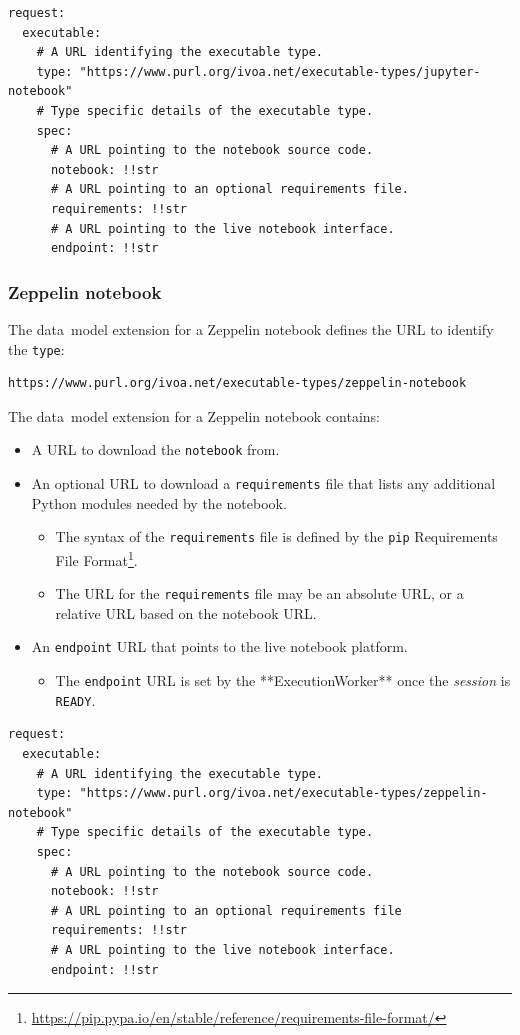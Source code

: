 \documentclass[11pt,a4paper]{ivoa}
\newcommand{\datamodel} {data~model}
\newcommand{\execworkerclass} {**ExecutionWorker**}
\newcommand{\workerjob}[1] {\textit{session#1}}
\newcommand{\python} {Python}
\newcommand{\zeppelin} {Zeppelin}
\newcommand{\codeword}[1] {\texttt{#1}}
\newcommand{\footurl}[1] {\footnote{\url{#1}}}
\begin{document}
\begin{lstlisting}[]
request:
  executable:
    # A URL identifying the executable type.
    type: "https://www.purl.org/ivoa.net/executable-types/jupyter-notebook"
    # Type specific details of the executable type.
    spec:
      # A URL pointing to the notebook source code.
      notebook: !!str
      # A URL pointing to an optional requirements file.
      requirements: !!str
      # A URL pointing to the live notebook interface.
      endpoint: !!str
\end{lstlisting}

\subsubsection{Zeppelin notebook}
\label{datamodel-zeppelin-notebook}

The \datamodel{} extension for a \zeppelin{} notebook defines the URL
to identify the \codeword{type}:
\begin{lstlisting}[]
https://www.purl.org/ivoa.net/executable-types/zeppelin-notebook
\end{lstlisting}
\hfill \break
The \datamodel{} extension for a \zeppelin{} notebook contains:
\begin{itemize}
    \item A URL to download the \codeword{notebook} from.
    \item An optional URL to download a \codeword{requirements} file that lists any additional
    \python{} modules needed by the notebook.
    \begin{itemize}
        \item The syntax of the \codeword{requirements} file is defined by the \codeword{pip}
        Requirements File Format\footurl{https://pip.pypa.io/en/stable/reference/requirements-file-format/}.
        \item The URL for the \codeword{requirements} file may be an absolute URL, or a relative URL based on the notebook URL.
    \end{itemize}
    \item An \codeword{endpoint} URL that points to the live notebook platform.
    \begin{itemize}
        \item The \codeword{endpoint} URL is set by the \execworkerclass{} once the \workerjob{} is \codeword{READY}.
    \end{itemize}
\end{itemize}

\begin{lstlisting}[]
request:
  executable:
    # A URL identifying the executable type.
    type: "https://www.purl.org/ivoa.net/executable-types/zeppelin-notebook"
    # Type specific details of the executable type.
    spec:
      # A URL pointing to the notebook source code.
      notebook: !!str
      # A URL pointing to an optional requirements file
      requirements: !!str
      # A URL pointing to the live notebook interface.
      endpoint: !!str
\end{lstlisting}
\end{document}
